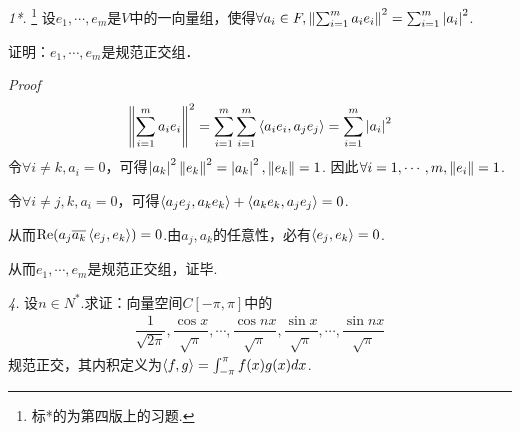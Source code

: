 \newpage

\textit{1*.} \footnote{标*的为第四版上的习题.}
设\(e_1,\cdots,e_m\)是\(V\)中的一向量组，使得\(\forall a_i \in F,\left\lVert \sum_{i=1}^m a_ie_i \right\rVert^2=\sum_{i=1}^m \left\lvert a_i \right\rvert^2\).

证明：\(e_1,\cdots,e_m\)是规范正交组．

\textit{Proof}
    \begin{align*}
        \left\lVert \sum_{i=1}^m a_ie_i \right\rVert^2=\sum_{i=1}^m \sum_{i=1}^m \left\langle a_ie_i,a_je_j \right\rangle=\sum_{i=1}^m \left\lvert a_i \right\rvert^2
    \end{align*}
令\(\forall i \ne k,a_i=0\)，可得\(\left\lvert a_{k} \right\rvert^2\left\lVert e_{k} \right\rVert^2=\left\lvert a_{k} \right\rvert^2,\left\lVert e_{k} \right\rVert=1\).
因此\(\forall i=1,\cdots,m,\left\lVert e_i \right\rVert=1\).

令\(\forall i \ne j,k,a_i=0\)，可得\(\left\langle a_je_j,a_ke_k \right\rangle+\left\langle a_ke_k,a_je_j \right\rangle=0\).

从而\(\mathrm{Re}(a_j\overline{a_k}\left\langle e_j,e_k \right\rangle)=0\).由\(a_j,a_k\)的任意性，必有\(\left\langle e_j,e_k \right\rangle=0\).

从而\(e_1,\cdots,e_m\)是规范正交组，证毕.

\hspace*{\fill}

\textit{4.}
设\(n \in N^*\).求证：向量空间\(C[-\pi,\pi]\)中的
    \begin{align*}
        \dfrac{1}{\sqrt{2\pi}},\dfrac{\cos x}{\sqrt{\pi}},\cdots,\dfrac{\cos nx}{\sqrt{\pi}},
        \dfrac{\sin x}{\sqrt{\pi}},\cdots,\dfrac{\sin nx}{\sqrt{\pi}}
    \end{align*}
规范正交，其内积定义为\(\left\langle f,g \right\rangle=\int_{-\pi}^{\pi}f(x)g(x)dx\).

